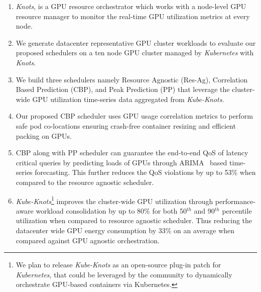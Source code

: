 \begin{enumerate}[wide = 0pt, labelwidth = 1.3em, labelsep*=0em, itemindent = 0pt, leftmargin = \dimexpr\labelwidth + \labelsep\relax, noitemsep,topsep = 1ex, font=\normalfont]

\item \textit{Knots}, is a GPU resource orchestrator which works with a node-level GPU resource manager to monitor the real-time GPU utilization metrics at every node.

\item We generate datacenter representative GPU cluster workloads to evaluate our proposed schedulers on a ten node GPU cluster managed by \textit{Kubernetes} with \textit{Knots}.

\item We build three schedulers namely Resource Agnostic (Res-Ag), Correlation Based Prediction (CBP), and Peak Prediction (PP) that leverage the cluster-wide GPU utilization time-series data aggregated from \textit{Kube-Knots}.


\item Our proposed CBP scheduler uses GPU usage correlation metrics to perform safe pod co-locations ensuring crash-free container resizing and efficient packing on GPUs.

\item CBP along with PP scheduler can guarantee the end-to-end QoS of latency critical queries by predicting loads of GPUs through ARIMA~\cite{arima} based time-series forecasting. This further reduces the QoS violations by up to 53\% when compared to the resource agnostic scheduler.

\item \textit{Kube-Knots}\footnote{We plan to release \textit{Kube-Knots} as an open-source plug-in patch for \textit{Kubernetes}, that could be leveraged by the community to dynamically orchestrate GPU-based containers via Kubernetes.} improves the cluster-wide GPU utilization through performance-aware workload consolidation by up to 80\%  for both 50$^{th}$ and 90$^{th}$ percentile utilization when compared to resource agnostic scheduler. Thus reducing the datacenter wide GPU energy consumption by 33\% on an average when compared against GPU agnostic orchestration.

\end{enumerate}

